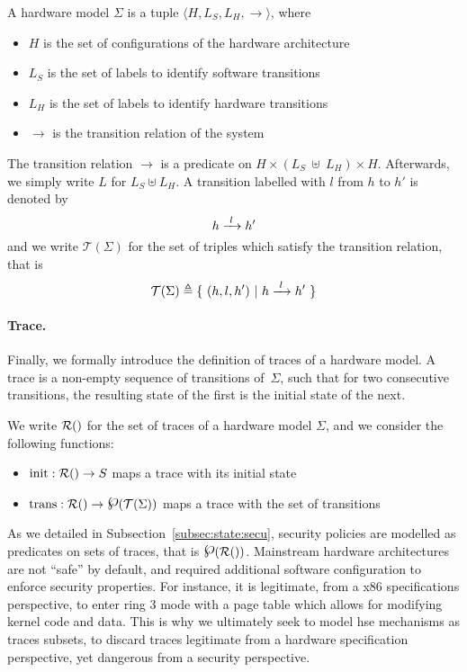 \begin{definition}
  \label{def:speccert:model}
  A hardware model $\Sigma$ is a tuple
  $\langle H, L_S, L_H, \rightarrow \rangle$, where
  \begin{itemize}
  \item $H$ is the set of configurations of the hardware architecture
  \item $L_S$ is the set of labels to identify software transitions
  \item $L_H$ is the set of labels to identify hardware transitions
  \item $\rightarrow$ is the transition relation of the system
  \end{itemize}

  The transition relation $\rightarrow$ is a predicate on
  $H \times (L_S~\uplus~L_H) \times H$.
  Afterwards, we simply write $L$ for $L_S \uplus L_H$.
  A transition labelled with $l$ from $h$ to $h'$ is denoted by
  \[
    h \xrightarrow{\hskip0.3em\relax l\hskip0.3em\relax} h'
  \]
  and we write $\mathcal{T}(\Sigma)$ for the set of triples which satisfy the
  transition relation, that is
  \[
    \mathcal{T}(\Sigma) \triangleq \{\ (h, l, h')\ |\ h \xrightarrow{\hskip0.3em\relax l\hskip0.3em\relax} h'\ \}
  \]
\end{definition}

\paragraph{Trace.}
%
Finally, we formally introduce the definition of traces of a hardware model.
%
A trace is a non-empty sequence of transitions of~$\Sigma$, such that for two
consecutive transitions, the resulting state of the first is the initial state
of the next.

\begin{definition}[Traces]
  \label{def:speccert:trace}
  We write $\pathesLTS{Ez}$ for the set of traces of a hardware model $\Sigma$,
  and we consider the following functions:
  \begin{itemize}
  \item $\func{init} : \pathesLTS{Ez} \rightarrow S$ maps a trace with its
    initial state
  \item
    $\func{trans} : \pathesLTS{Ez} \rightarrow \powerset(\mathcal{T}(\Sigma))$
    maps a trace with the set of transitions
  \end{itemize}
\end{definition}

As we detailed in Subsection~\ref{subsec:state:secu}, security policies are
modelled as predicates on sets of traces, that is $\powerset (\pathesLTS{Ez})$.
%
Mainstream hardware architectures are not ``safe'' by default, and required
additional software configuration to enforce security properties.
%
For instance, it is legitimate, from a x86 specifications perspective, to enter
ring 3 mode with a page table which allows for modifying kernel code and data.
%
This is why we ultimately seek to model \ac{hse} mechanisms as traces subsets,
to discard traces legitimate from a hardware specification perspective, yet
dangerous from a security perspective.

